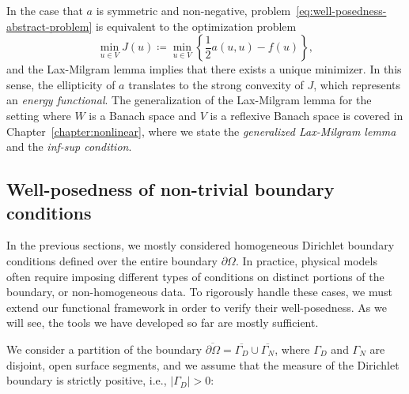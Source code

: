 In the case that $a$ is symmetric and non-negative, problem~\ref{eq:well-posedness-abstract-problem} is equivalent to the optimization problem 
\begin{equation*}
    \min_{u\in V} J(u) \coloneqq \min_{u\in V} \left\{\frac{1}{2}a(u,u) - f(u)\right\},
\end{equation*}
and the Lax-Milgram lemma implies that there exists a unique minimizer. In this sense, the ellipticity of $a$ translates to the strong convexity of $J$, which represents an \emph{energy functional}. 
The generalization of the Lax-Milgram lemma for the setting where $W$ is a Banach space and $V$ is a reflexive Banach space is covered in Chapter~\ref{chapter:nonlinear}, where we state the \emph{generalized Lax-Milgram lemma} and the \emph{inf-sup condition}. 

\subsection{Well-posedness of non-trivial boundary conditions}

In the previous sections, we mostly considered homogeneous Dirichlet boundary conditions defined over the entire boundary $\partial\Omega$. In practice, physical models often require imposing different types of conditions on distinct portions of the boundary, or non-homogeneous data. To rigorously handle these cases, we must extend our functional framework in order to verify their well-posedness. As we will see, the tools we have developed so far are mostly sufficient.

We consider a partition of the boundary $\overline{\partial\Omega} = \overline{\Gamma_D} \cup \overline{\Gamma_N}$, where $\Gamma_D$ and $\Gamma_N$ are disjoint, open surface segments, and we assume that the measure of the Dirichlet boundary is strictly positive, i.e., $|\Gamma_D| > 0$:

\begin{center}
\end{center}


